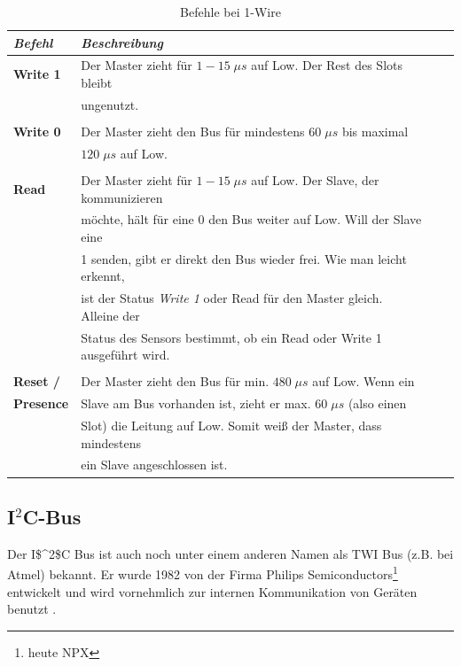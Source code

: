 \begin{table}[H]
\centering
\begin{tabular}{
llll
}
\toprule
\multicolumn{1}{p{2cm}}{\textit{Befehl} }&\multicolumn{1}{p{10cm}}{\centering\textit{Beschreibung} }\\\midrule
\textbf{Write 1} & Der Master zieht für $1-15\;\mu s$ auf Low. Der Rest des Slots bleibt \\
& ungenutzt.\\
&\\
\textbf{Write 0} & Der Master zieht den Bus für mindestens $60\;\mu s$ bis maximal\\
& $120\;\mu s$ auf Low.\\
&\\
\textbf{Read}& Der Master zieht für $1-15\;\mu s$ auf Low. Der Slave, der kommunizieren\\
& möchte, hält für eine 0 den Bus weiter auf Low. Will der Slave eine\\
& 1 senden, gibt er direkt den Bus wieder frei. Wie man leicht erkennt,\\
& ist der Status \textit{Write 1} oder Read für den Master gleich. Alleine der \\
& Status des Sensors bestimmt, ob ein Read oder Write 1 ausgeführt wird. \\
&\\
\textbf{Reset /} & Der Master zieht den Bus für min. $480\;\mu s$ auf Low. Wenn ein\\
\textbf{Presence} & Slave am Bus vorhanden ist, zieht er max. $60\;\mu s$ (also einen\\
& Slot) die Leitung auf Low. Somit weiß der Master, dass mindestens\\
& ein Slave angeschlossen ist.\\ 
\bottomrule
\end{tabular}
\caption{Befehle bei 1-Wire \citep[S. 35]{Bussysteme_in_der_Praxis}}
\label{Tabelle_Befehle_1Wire}
\end{table}

\subsection{I$^2$C-Bus}
\label{subsection_I2C}
Der \ac{I$^2$C} Bus ist auch noch unter einem anderen Namen als \ac{TWI} Bus (z.B. bei Atmel) bekannt. Er wurde 1982 von der Firma Philips Semiconductors\footnote{heute NPX} entwickelt und wird vornehmlich zur internen Kommunikation von Geräten benutzt \citep{Bussysteme_in_der_Praxis}.

